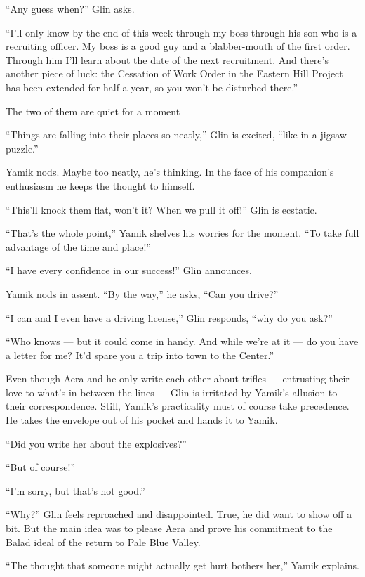 \documentclass[twoside,11pt,openany]{book}
\begin{document}
``Any guess when?'' Glin asks.

``I'll only know by the end of this week through my boss through his son who is a recruiting officer. My
boss is a good guy and a blabber-mouth of the first order. Through him I'll learn about the date of the next
recruitment. And there's another piece of luck: the Cessation of Work Order in the Eastern Hill Project has
been extended for half a year, so you won't be disturbed there.''

The two of them are quiet for a moment

``Things are falling into their places so neatly,'' Glin is excited, ``like in a
jigsaw puzzle.''

Yamik nods. Maybe too neatly, he's thinking. In the face of his companion's enthusiasm he keeps the thought to himself.

``This'll knock them flat, won't it? When we pull it off!'' Glin is ecstatic.

``That's the whole point,'' Yamik shelves his worries for the moment. ``To take
full advantage of the time and place!''

``I have every confidence in our success!'' Glin announces.

Yamik nods in assent. ``By the way,'' he asks, ``Can you drive?''

``I can and I even have a driving license,'' Glin responds, ``why do you
ask?''

``Who knows --- but it could come in handy. And while we're at it --- do you have a letter for me? It'd spare you a
trip into town to the Center.''

Even though Aera and he only write each other about trifles --- entrusting their love to what's in between the lines ---
Glin is irritated by Yamik's allusion to their correspondence. Still, Yamik's practicality must of course take
precedence.  He takes the envelope out of his pocket and hands it to Yamik.

``Did you write her about the explosives?''

``But of course!''

``I'm sorry, but that's not good.''

``Why?'' Glin feels reproached and disappointed. True, he did want to show off a bit. But the
main idea was to please Aera and prove his commitment to the Balad ideal of the return to Pale Blue Valley.

``The thought that someone might actually get hurt bothers her,'' Yamik explains.
\end{document}
